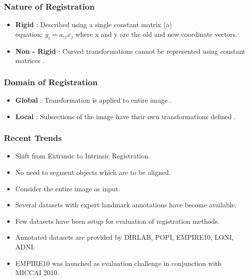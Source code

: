 \documentclass{beamer}
\begin{document}
\begin{frame}
\frametitle{Nature of Registration}
\begin{itemize}
	\item \textbf{Rigid} : Described using a single constant matrix (a) \\ equation: $y_{i} = a_{ij}x_{j}$
	where x and y are the old and new coordinate vectors.
	\\
	\item \textbf{Non - Rigid} : Curved transformations cannot be represented using constant matrices .
 
	
	
\end{itemize}
\end{frame}

\begin{frame}
\frametitle{Domain of Registration}
\begin{itemize}
\item \textbf{Global} : Transformation is applied to entire image .
\item \textbf{Local} : Subsections of the image have their own transformations defined .
\end{itemize}
\end{frame}

\begin{frame}
\frametitle{Recent Trends}
\begin{itemize}
	\item Shift from Extrinsic to Intrinsic Registration.
	
	\item No need to segment objects which are to be aligned.
	
	\item Consider the entire image as input.
	
	\item Several datasets with expert landmark annotations have become available.
	
	\item Few datasets have been setup for evaluation of registration methods.
	
	\item Annotated datasets are provided by DIRLAB, POPI, EMPIRE10, LONI, ADNI.
	
	\item EMPIRE10 was launched as evaluation challenge in conjunction with MICCAI 2010.
	
	

\end{itemize}


\end{frame}
\end{document}

